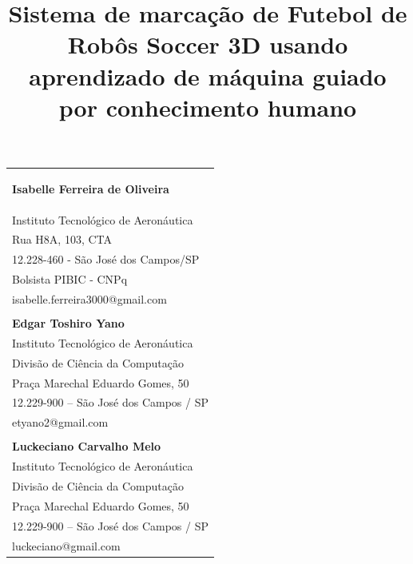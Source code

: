 \documentclass[10pt,fleqn,a4paper]{article}
\begin{document}
    
	{
	}
    \thispagestyle{firststyle}
    \vspace{-.5cm}
    \hspace{-.8cm}
    \begin{tabular}{p{\textwidth}}
    \begin{center}
    \vspace{-.6cm}
    \title{Sistema de marcação de Futebol de Robôs Soccer 3D usando aprendizado de máquina guiado por conhecimento humano}
    \end{center}
    \textbf{Isabelle Ferreira de Oliveira}\\
    \small{Instituto Tecnológico de Aeronáutica}\\
    \small{Rua H8A, 103, CTA}\\
    \small{12.228-460 - São José dos Campos/SP}\\
    \small{Bolsista PIBIC - CNPq}\\
    \small{isabelle.ferreira3000@gmail.com}\\
    \\ 
    \textbf{Edgar Toshiro Yano}\\
    \small{Instituto Tecnológico de Aeronáutica}\\
    \small{Divisão de Ciência da Computação}\\
    \small{Praça Marechal Eduardo Gomes, 50}\\
    \small{12.229-900 – São José dos Campos / SP}\\
    \small{etyano2@gmail.com}\\
    \\ 
    \textbf{Luckeciano Carvalho Melo}\\
    \small{Instituto Tecnológico de Aeronáutica}\\
    \small{Divisão de Ciência da Computação}\\
    \small{Praça Marechal Eduardo Gomes, 50}\\
    \small{12.229-900 – São José dos Campos / SP}\\
    \small{luckeciano@gmail.com}\\

\end{tabular}
\end{document}
